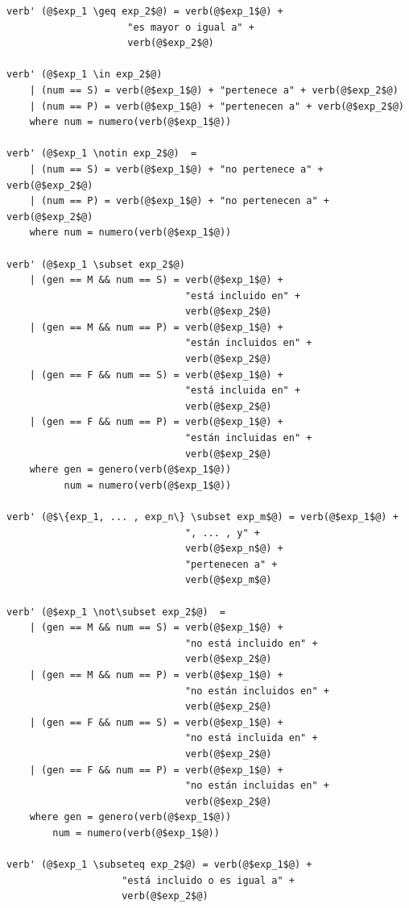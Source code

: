 \begin{mdframed}[style=codebox]
\begin{verbatim}
verb' (@$exp_1 \geq exp_2$@) = verb(@$exp_1$@) +  
                     "es mayor o igual a" +  
                     verb(@$exp_2$@) 

verb' (@$exp_1 \in exp_2$@)
    | (num == S) = verb(@$exp_1$@) + "pertenece a" + verb(@$exp_2$@) 
    | (num == P) = verb(@$exp_1$@) + "pertenecen a" + verb(@$exp_2$@) 
    where num = numero(verb(@$exp_1$@))

verb' (@$exp_1 \notin exp_2$@)  = 
    | (num == S) = verb(@$exp_1$@) + "no pertenece a" + verb(@$exp_2$@) 
    | (num == P) = verb(@$exp_1$@) + "no pertenecen a" + verb(@$exp_2$@) 
    where num = numero(verb(@$exp_1$@))

verb' (@$exp_1 \subset exp_2$@)
    | (gen == M && num == S) = verb(@$exp_1$@) + 
                               "está incluido en" + 
                               verb(@$exp_2$@) 
    | (gen == M && num == P) = verb(@$exp_1$@) + 
                               "están incluidos en" + 
                               verb(@$exp_2$@) 
    | (gen == F && num == S) = verb(@$exp_1$@) + 
                               "está incluida en" + 
                               verb(@$exp_2$@) 
    | (gen == F && num == P) = verb(@$exp_1$@) + 
                               "están incluidas en" + 
                               verb(@$exp_2$@) 
    where gen = genero(verb(@$exp_1$@))
          num = numero(verb(@$exp_1$@))

verb' (@$\{exp_1, ... , exp_n\} \subset exp_m$@) = verb(@$exp_1$@) +  
                               ", ... , y" +  
                               verb(@$exp_n$@) +  
                               "pertenecen a" +
                               verb(@$exp_m$@)

verb' (@$exp_1 \not\subset exp_2$@)  = 
    | (gen == M && num == S) = verb(@$exp_1$@) + 
                               "no está incluido en" + 
                               verb(@$exp_2$@) 
    | (gen == M && num == P) = verb(@$exp_1$@) + 
                               "no están incluidos en" + 
                               verb(@$exp_2$@) 
    | (gen == F && num == S) = verb(@$exp_1$@) + 
                               "no está incluida en" + 
                               verb(@$exp_2$@) 
    | (gen == F && num == P) = verb(@$exp_1$@) + 
                               "no están incluidas en" + 
                               verb(@$exp_2$@) 
    where gen = genero(verb(@$exp_1$@))
        num = numero(verb(@$exp_1$@))

verb' (@$exp_1 \subseteq exp_2$@) = verb(@$exp_1$@) +  
                    "está incluido o es igual a" +  
                    verb(@$exp_2$@) 


\end{verbatim}
\end{mdframed}
